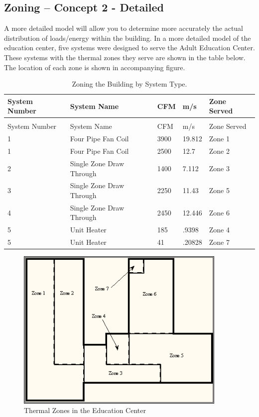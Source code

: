 \subsection{Zoning -- Concept 2 - Detailed}\label{zoning-concept-2---detailed}

A more detailed model will allow you to determine more accurately the actual distribution of loads/energy within the building. In a more detailed model of the education center, five systems were designed to serve the Adult Education Center. These systems with the thermal zones they serve are shown in the table below. The location of each zone is shown in accompanying figure.

\begin{longtable}[c]{@{}lllll@{}}
\caption{Zoning the Building by System Type. \label{table:zoning-the-building-by-system-type.}} \tabularnewline
\toprule 
System Number & System Name & CFM & m/s & Zone Served \tabularnewline
\midrule
\endfirsthead

\caption[]{Zoning the Building by System Type.} \tabularnewline
\toprule 
System Number & System Name & CFM & m/s & Zone Served \tabularnewline
\midrule
\endhead

1 & Four Pipe Fan Coil & 3900 & 19.812 & Zone 1 \tabularnewline
1 & Four Pipe Fan Coil & 2500 & 12.7 & Zone 2 \tabularnewline
2 & Single Zone Draw Through & 1400 & 7.112 & Zone 3 \tabularnewline
3 & Single Zone Draw Through & 2250 & 11.43 & Zone 5 \tabularnewline
4 & Single Zone Draw Through & 2450 & 12.446 & Zone 6 \tabularnewline
5 & Unit Heater & 185 & .9398 & Zone 4 \tabularnewline
5 & Unit Heater & 41 & .20828 & Zone 7 \tabularnewline
\bottomrule
\end{longtable}

\begin{figure}[hbtp] %
\centering
\includegraphics[width=0.9\textwidth, height=0.9\textheight, keepaspectratio=true]{media/image014.png}
\caption{Thermal Zones in the Education Center \protect \label{fig:thermal-zones-in-the-education-center}}
\end{figure}

